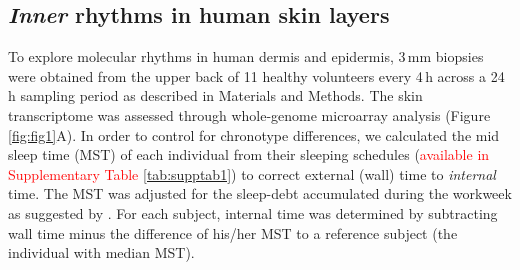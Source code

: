 \subsection*{\textit{Inner }rhythms in human skin layers} %
To explore molecular rhythms in human dermis and epidermis, 3\,mm biopsies were obtained from the upper back of 11 healthy volunteers every 4\,h across a 24\,h sampling period as described in Materials and Methods. The skin transcriptome was assessed through whole-genome microarray analysis (Figure \ref{fig:fig1}A). In order to control for chronotype differences, we calculated the mid sleep time (MST) of each individual from their sleeping schedules (\textcolor{red}{available in Supplementary Table \ref{tab:supptab1}}) to correct external (wall) time to \textit{internal} time. The MST was adjusted for the sleep-debt accumulated during the workweek as suggested by \cite{Vetter2021}. For each subject, internal time was determined by subtracting wall time minus the difference of his/her MST to a reference subject (the individual with median MST).  \\

